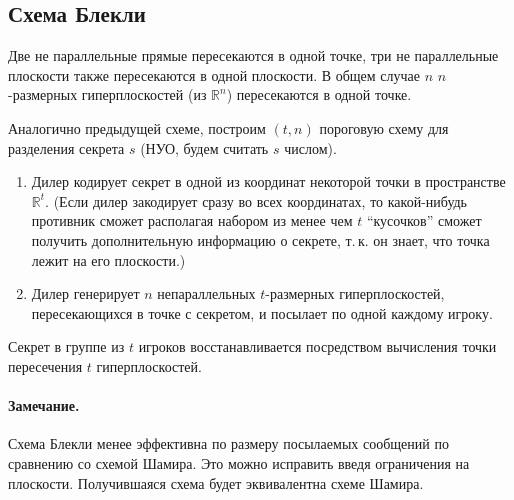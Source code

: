 \documentclass[a4paper,10pt]{article}
\begin{document}
\subsection{Схема Блекли}
Две не параллельные прямые пересекаются в одной точке, три не параллельные плоскости также
пересекаются в одной плоскости. В общем случае $n$ $n$-размерных гиперплоскостей (из $\mathbb{R}^n$)
пересекаются в одной точке.

Аналогично предыдущей схеме, построим $(t,n)$ пороговую схему для разделения секрета $s$ (НУО, будем
считать $s$ числом).

\begin{enumerate}
    \item Дилер кодирует секрет в одной из координат некоторой точки в пространстве $\mathbb{R}^t$.
        (Если дилер закодирует сразу во всех координатах, то какой-нибудь противник сможет
        располагая набором из менее чем $t$ ``кусочков'' сможет получить дополнительную информацию о
        секрете, т.\,к. он знает, что точка лежит на его плоскости.)
    \item Дилер генерирует $n$ непараллельных $t$-размерных гиперплоскостей, пересекающихся в точке
        с секретом, и посылает по одной каждому игроку.
\end{enumerate}
Секрет в группе из $t$ игроков восстанавливается посредством вычисления точки пересечения $t$
гиперплоскостей.

\paragraph{Замечание.} Схема Блекли менее эффективна по размеру посылаемых сообщений по сравнению со схемой Шамира.
Это можно исправить введя ограничения на плоскости. Получившаяся схема будет эквивалентна
схеме Шамира.
\end{document}
